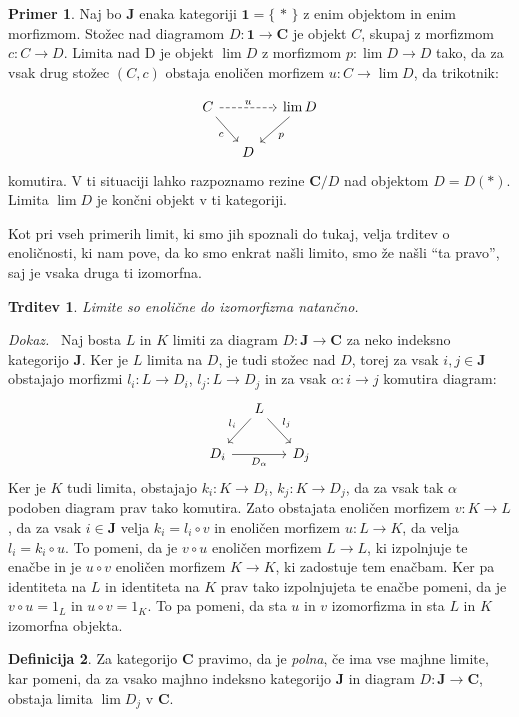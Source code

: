 \documentclass[12pt,a4paper]{book}
\theoremstyle{definition}
\newtheorem{definicija}{Definicija}[chapter]
\theoremstyle{plain}
\newtheorem{trditev}[definicija]{Trditev}
\newenvironment{dokaz}{\emph{Dokaz.}\ }{\hspace{\fill}{$\Box$}}
\theoremstyle{definition}
\newtheorem{primer}{Primer}[section]
\theoremstyle{remark}
\newcommand{\cat}[1]{\textbf{#1}}
\renewcommand{\set}[1]{\{\,#1\,\}}
\begin{document}
\begin{primer}
Naj bo $\cat{J}$ enaka kategoriji $\cat{1} = \set{\ast}$ z enim objektom in enim morfizmom. Stožec nad diagramom $D : \cat{1} \to \cat{C}$ je objekt $C$, skupaj z morfizmom $c : C \to D$. Limita nad D je objekt $\lim D$ z morfizmom $p : \lim D \to D$ tako, da za vsak drug stožec $(C, c)$ obstaja enoličen morfizem $u : C \to \lim D$, da trikotnik:

$$\begin{tikzcd}[column sep=small]
C \ar[dr, "c"'] \ar[rr, dashed, "u"] & & \lim D \ar[dl, "p"] \\
& D &
\end{tikzcd}$$
komutira. V ti situaciji lahko razpoznamo rezine $\cat{C}/D$ nad objektom $D = D(\ast)$. Limita $\lim D$ je končni objekt v ti kategoriji.
\end{primer}
%
Kot pri vseh primerih limit, ki smo jih spoznali do tukaj, velja trditev o enoličnosti, ki nam pove, da ko smo enkrat našli limito, smo že našli "`ta pravo"', saj je vsaka druga ti izomorfna.
%
\begin{trditev}
Limite so enolične do izomorfizma natančno.
\end{trditev}
\begin{dokaz}
Naj bosta $L$ in $K$ limiti za diagram $D : \cat{J} \to \cat{C}$ za neko indeksno kategorijo $\cat{J}$. Ker je $L$ limita na $D$, je tudi stožec nad $D$, torej za vsak $i,j \in \cat{J}$ obstajajo morfizmi $l_i : L \to D_i$, $l_j: L \to D_j$ in za vsak $\alpha : i \to j$ komutira diagram:
$$
\begin{tikzcd}[column sep=small]
& L \ar[dl, "l_i"'] \ar[dr, "l_j"] & \\
D_i \ar[rr, "D_\alpha"'] & & D_j
\end{tikzcd}
$$
Ker je $K$ tudi limita, obstajajo $k_i : K \to D_i$, $k_j : K \to D_j$, da za vsak tak $\alpha$ podoben diagram prav tako komutira. Zato obstajata enoličen morfizem $v : K \to L$, da za vsak $i \in \cat{J}$ velja $k_i = l_i \circ v$ in enoličen morfizem $u: L \to K$, da velja $l_i = k_i \circ u$. To pomeni, da je $v \circ u$ enoličen morfizem $L \to L$, ki izpolnjuje te enačbe in je $u \circ v$ enoličen morfizem $K \to K$, ki zadostuje tem enačbam. Ker pa identiteta na $L$ in identiteta na $K$ prav tako izpolnjujeta te enačbe pomeni, da je $v \circ u = 1_L$ in $u \circ v = 1_K$. To pa pomeni, da sta $u$ in $v$ izomorfizma in sta $L$ in $K$ izomorfna objekta.
\end{dokaz}

\begin{definicija}
Za kategorijo $\cat{C}$ pravimo, da je \emph{polna}, če ima vse majhne limite, kar pomeni, da za vsako majhno indeksno kategorijo $\cat{J}$ in diagram $D : \cat{J} \to \cat{C}$, obstaja limita $\lim D_j$ v $\cat{C}$.
\end{definicija}
\end{document}
